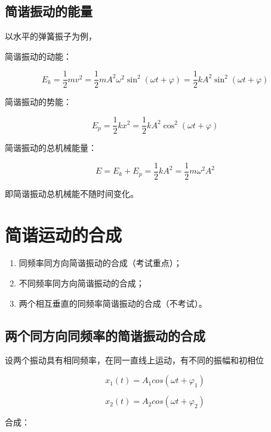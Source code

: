 \documentclass[
	12pt, %
	a4paper, %
]{myLegrandOrangeBook}
\begin{document}
\subsection{简谐振动的能量}

    以水平的弹簧振子为例，

    简谐振动的动能：

    \begin{equation}
        E_k=\frac{1}{2} m v^2 =\frac{1}{2} m A^2 \omega^2 \sin ^2(\omega t+\varphi)
        =\frac{1}{2} k A^2 \sin ^2(\omega t+\varphi)
    \end{equation}

    简谐振动的势能：

    \begin{equation}
        E_p=\frac{1}{2} k x^2=\frac{1}{2} k A^2 \cos ^2(\omega t+\varphi)
    \end{equation}

    简谐振动的总机械能量：

    \begin{equation}
        E=E_k+E_p=\frac{1}{2} k A^2=\frac{1}{2} m \omega^2 A^2
    \end{equation}

    即简谐振动总机械能不随时间变化。

\section{简谐运动的合成}

    \begin{enumerate}
        \item 同频率同方向简谐振动的合成（考试重点）；
        \item 不同频率同方向简谐振动的合成；
        \item 两个相互垂直的同频率简谐振动的合成（不考试）。
    \end{enumerate}

\subsection{两个同方向同频率的简谐振动的合成}

    设两个振动具有相同频率，在同一直线上运动，有不同的振幅和初相位

    \[
        x_1\left(t\right) = A_1 cos\left(\omega t + \varphi_1\right)
    \]

    \[
        x_2\left(t\right) = A_2 cos\left(\omega t + \varphi_2\right)
    \]

    合成：
\end{document}
